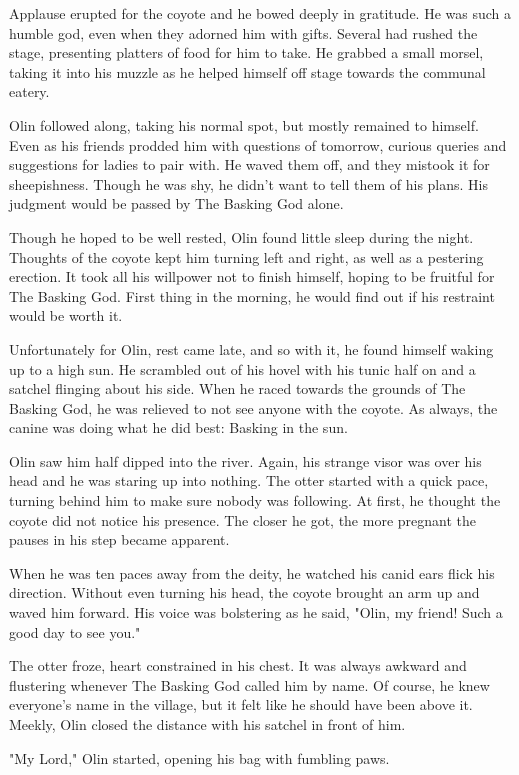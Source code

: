 Applause erupted for the coyote and he bowed deeply in gratitude. He was such a humble god, even when they adorned him with gifts. Several had rushed the stage, presenting platters of food for him to take. He grabbed a small morsel, taking it into his muzzle as he helped himself off stage towards the communal eatery.

Olin followed along, taking his normal spot, but mostly remained to himself. Even as his friends prodded him with questions of tomorrow, curious queries and suggestions for ladies to pair with. He waved them off, and they mistook it for sheepishness. Though he was shy, he didn't want to tell them of his plans. His judgment would be passed by The Basking God alone.

Though he hoped to be well rested, Olin found little sleep during the night. Thoughts of the coyote kept him turning left and right, as well as a pestering erection. It took all his willpower not to finish himself, hoping to be fruitful for The Basking God. First thing in the morning, he would find out if his restraint would be worth it.

Unfortunately for Olin, rest came late, and so with it, he found himself waking up to a high sun. He scrambled out of his hovel with his tunic half on and a satchel flinging about his side. When he raced towards the grounds of The Basking God, he was relieved to not see anyone with the coyote. As always, the canine was doing what he did best: Basking in the sun.

Olin saw him half dipped into the river. Again, his strange visor was over his head and he was staring up into nothing. The otter started with a quick pace, turning behind him to make sure nobody was following. At first, he thought the coyote did not notice his presence. The closer he got, the more pregnant the pauses in his step became apparent.

When he was ten paces away from the deity, he watched his canid ears flick his direction. Without even turning his head, the coyote brought an arm up and waved him forward. His voice was bolstering as he said, "Olin, my friend! Such a good day to see you."

The otter froze, heart constrained in his chest. It was always awkward and flustering whenever The Basking God called him by name. Of course, he knew everyone's name in the village, but it felt like he should have been above it. Meekly, Olin closed the distance with his satchel in front of him.

"My Lord," Olin started, opening his bag with fumbling paws.

